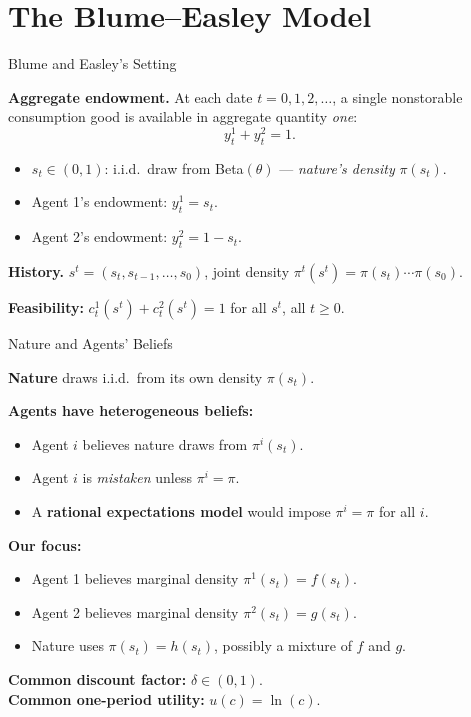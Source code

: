 \documentclass[aspectratio=169,12pt]{beamer}
\begin{document}
\section{The Blume--Easley Model}

\begin{frame}{Blume and Easley's Setting}

\textbf{Aggregate endowment.}
At each date $t=0,1,2,\ldots$, a single nonstorable consumption good is
available in aggregate quantity \emph{one}:
\[
  y_t^1 + y_t^2 = 1.
\]

\begin{itemize}
  \item $s_t \in(0,1)$: i.i.d.\ draw from Beta$(\theta)$ --- \emph{nature's density} $\pi(s_t)$.
  \item Agent 1's endowment: $y_t^1 = s_t$.
  \item Agent 2's endowment: $y_t^2 = 1-s_t$.
\end{itemize}

\bigskip
\textbf{History.}
$s^t = (s_t, s_{t-1},\ldots,s_0)$, joint density
$\pi^t(s^t)=\pi(s_t)\cdots\pi(s_0)$.

\bigskip
\textbf{Feasibility:} $c_t^1(s^t)+c_t^2(s^t)=1$ for all $s^t$, all $t\geq 0$.

\end{frame}

\begin{frame}{Nature and Agents' Beliefs}

\textbf{Nature} draws i.i.d.\ from its own density $\pi(s_t)$.

\bigskip
\textbf{Agents have heterogeneous beliefs:}
\begin{itemize}
  \item Agent $i$ believes nature draws from $\pi^i(s_t)$.
  \item Agent $i$ is \emph{mistaken} unless $\pi^i = \pi$.
  \item A \textbf{rational expectations model} would impose $\pi^i = \pi$ for all $i$.
\end{itemize}

\bigskip
\textbf{Our focus:}
\begin{itemize}
  \item Agent 1 believes marginal density $\pi^1(s_t) = f(s_t)$.
  \item Agent 2 believes marginal density $\pi^2(s_t) = g(s_t)$.
  \item Nature uses $\pi(s_t) = h(s_t)$, possibly a mixture of $f$ and $g$.
\end{itemize}

\bigskip
\textbf{Common discount factor:} $\delta \in (0,1)$.\\
\textbf{Common one-period utility:} $u(c) = \ln(c)$.

\end{frame}
\end{document}
